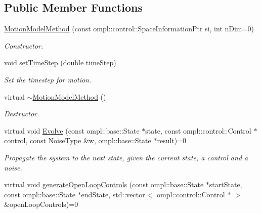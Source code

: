 \subsection*{\-Public \-Member \-Functions}
\begin{DoxyCompactItemize}
\item 
\hypertarget{class_motion_model_method_ae6076a87b40c19bd8e65ba6c0a82fb8c}{\hyperlink{class_motion_model_method_ae6076a87b40c19bd8e65ba6c0a82fb8c}{\-Motion\-Model\-Method} (const ompl\-::control\-::\-Space\-Information\-Ptr si, int n\-Dim=0)}\label{class_motion_model_method_ae6076a87b40c19bd8e65ba6c0a82fb8c}

\begin{DoxyCompactList}\small\item\em \-Constructor. \end{DoxyCompactList}\item 
\hypertarget{class_motion_model_method_aa15c21f81b71cfe8c65224bbdfba61d8}{void \hyperlink{class_motion_model_method_aa15c21f81b71cfe8c65224bbdfba61d8}{set\-Time\-Step} (double time\-Step)}\label{class_motion_model_method_aa15c21f81b71cfe8c65224bbdfba61d8}

\begin{DoxyCompactList}\small\item\em \-Set the timestep for motion. \end{DoxyCompactList}\item 
\hypertarget{class_motion_model_method_a1d703f6d9b1f68e19b67a177d8034112}{virtual \hyperlink{class_motion_model_method_a1d703f6d9b1f68e19b67a177d8034112}{$\sim$\-Motion\-Model\-Method} ()}\label{class_motion_model_method_a1d703f6d9b1f68e19b67a177d8034112}

\begin{DoxyCompactList}\small\item\em \-Destructor. \end{DoxyCompactList}\item 
\hypertarget{class_motion_model_method_a9fafbf79b4ea570819e01050dadf4826}{virtual void \hyperlink{class_motion_model_method_a9fafbf79b4ea570819e01050dadf4826}{\-Evolve} (const ompl\-::base\-::\-State $\ast$state, const ompl\-::control\-::\-Control $\ast$control, const \-Noise\-Type \&w, ompl\-::base\-::\-State $\ast$result)=0}\label{class_motion_model_method_a9fafbf79b4ea570819e01050dadf4826}

\begin{DoxyCompactList}\small\item\em \-Propagate the system to the next state, given the current state, a control and a noise. \end{DoxyCompactList}\item 
\hypertarget{class_motion_model_method_a6ec853871652bfa2c4fdad2c46e81e44}{virtual void \hyperlink{class_motion_model_method_a6ec853871652bfa2c4fdad2c46e81e44}{generate\-Open\-Loop\-Controls} (const ompl\-::base\-::\-State $\ast$start\-State, const ompl\-::base\-::\-State $\ast$end\-State, std\-::vector$<$ ompl\-::control\-::\-Control $\ast$ $>$ \&open\-Loop\-Controls)=0}\label{class_motion_model_method_a6ec853871652bfa2c4fdad2c46e81e44}


\end{DoxyCompactItemize}
